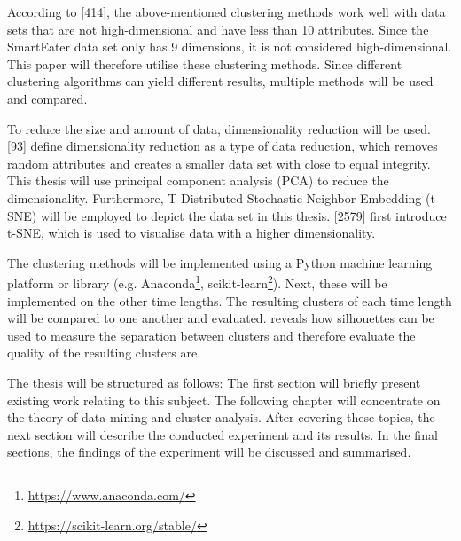 According to \textcite{han2011data}[414], the above-mentioned clustering methods work well with data sets that are not high-dimensional and have less than 10 attributes. Since the SmartEater data set only has 9 dimensions, it is not considered high-dimensional. This paper will therefore utilise these clustering methods. Since different clustering algorithms can yield different results, multiple methods will be used and compared.

To reduce the size and amount of data, dimensionality reduction will be used. \textcite{han2011data}[93] define dimensionality reduction as a type of data reduction, which removes random attributes and creates a smaller data set with close to equal integrity. This thesis will use principal component analysis (PCA) to reduce the dimensionality.
Furthermore, T-Distributed Stochastic Neighbor Embedding (t-SNE) will be employed to depict the data set in this thesis. \textcite{maaten2008visualizing}[2579] first introduce t-SNE, which is used to visualise data with a higher dimensionality. 

The clustering methods will be implemented using a Python machine learning platform or library (e.g. Anaconda\footnote{\url{https://www.anaconda.com/}}, scikit-learn\footnote{\url{https://scikit-learn.org/stable/}}). Next, these will be implemented on the other time lengths. The resulting clusters of each time length will be compared to one another and evaluated. 
\textcite{rousseeuw1987silhouettes} reveals how silhouettes can be used to measure the separation between clusters and therefore evaluate the quality of the resulting clusters are.



The thesis will be structured as follows: The first section will briefly present existing work relating to this subject. The following chapter will concentrate on the theory of data mining and cluster analysis. After covering these topics, the next section will describe the conducted experiment and its results. In the final sections, the findings of the experiment will be discussed and summarised. 




